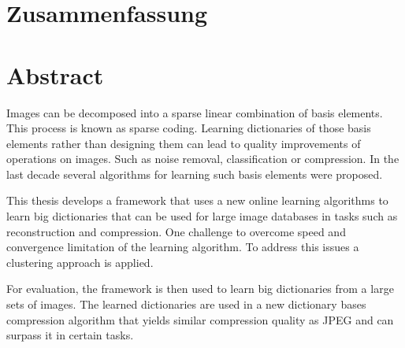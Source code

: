 \newpage
{}
{}
\chapter*{Zusammenfassung}
\thispagestyle{empty}

\newpage
{}
{}
\chapter*{Abstract}
\thispagestyle{empty}

Images can be decomposed into a sparse linear combination of basis
elements. This process is known as sparse coding. Learning dictionaries of
those basis elements rather than designing them can lead to quality improvements
of operations on images. Such as noise removal, classification or compression.
In the last decade several algorithms for learning such basis elements were
proposed.

This thesis develops a framework that uses a new online learning
algorithms to learn big dictionaries that can be used for large image databases
in tasks such as reconstruction and compression. One challenge  to overcome
speed and convergence limitation of the learning algorithm. To address this
issues a clustering approach is applied. 

For evaluation, the framework is then used to learn big dictionaries from a
large sets of images. The learned dictionaries are used in a new dictionary
bases compression algorithm that yields similar compression quality as JPEG and
can surpass it in certain tasks.



